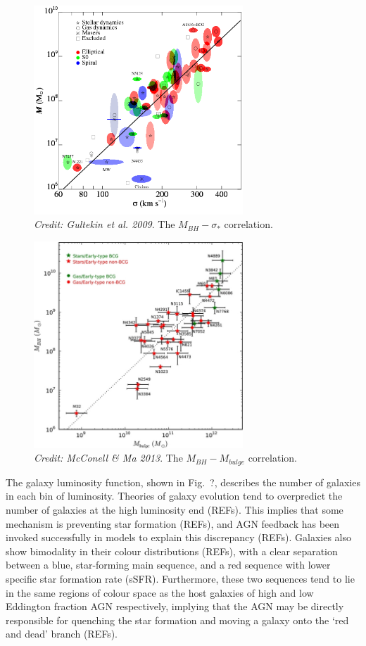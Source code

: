 \nocite{mcconnell2013,gultekin2009}
\begin{figure}
\centering
\includegraphics[width=0.7\textwidth]{figures/02-outflows/msigma.png}
\caption
{
{\sl Credit: Gultekin et al. 2009}. 
The $M_{BH}-\sigma_*$ correlation.
} 
\label{fig:msigma}
\end{figure}

\begin{figure}
\centering
\includegraphics[width=0.7\textwidth]{figures/02-outflows/mbulge.jpg}
\caption
{
{\sl Credit: McConell \& Ma 2013}. 
The $M_{BH}-M_{bulge}$ correlation.
} 
\label{fig:mbulge}
\end{figure}

The galaxy luminosity function, shown in Fig.~?, describes
the number of galaxies in each bin of luminosity. Theories of 
galaxy evolution tend to overpredict the number of galaxies at the
high luminosity end (REFs). This implies that some mechanism is 
preventing star formation (REFs), and AGN feedback has been invoked
successfully in models to explain this discrepancy (REFs).
Galaxies also show bimodality in their colour distributions 
(REFs), with a clear separation between a blue, star-forming
main sequence, and a red sequence with lower specific star formation
rate (sSFR). Furthermore, these two sequences tend to lie in the 
same regions of colour space as the host galaxies of high and low 
Eddington fraction AGN respectively, implying that the AGN may be 
directly responsible for quenching the star formation and moving 
a galaxy onto the `red and dead' branch (REFs).

